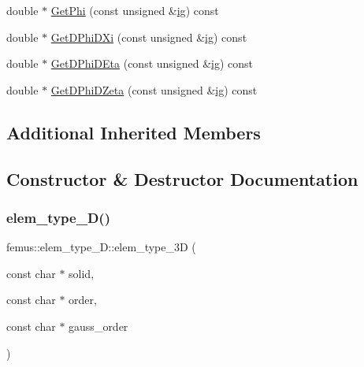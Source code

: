 \begin{DoxyCompactItemize}
double $\ast$ \mbox{\hyperlink{classfemus_1_1elem__type__3_d_ac25f62fb2b22b534172ce6ef94b89068}{Get\+Phi}} (const unsigned \&\mbox{\hyperlink{namespacefemus_a6df31099f676311de214a312d7043941}{ig}}) const
\item 
double $\ast$ \mbox{\hyperlink{classfemus_1_1elem__type__3_d_aff869fa323fd20f83fed73f4a28de006}{Get\+D\+Phi\+D\+Xi}} (const unsigned \&\mbox{\hyperlink{namespacefemus_a6df31099f676311de214a312d7043941}{ig}}) const
\item 
double $\ast$ \mbox{\hyperlink{classfemus_1_1elem__type__3_d_aa08787fdf3934c52c41a14a59884eb7b}{Get\+D\+Phi\+D\+Eta}} (const unsigned \&\mbox{\hyperlink{namespacefemus_a6df31099f676311de214a312d7043941}{ig}}) const
\item 
double $\ast$ \mbox{\hyperlink{classfemus_1_1elem__type__3_d_a8bf7020e0c07cf44c9532f9b6bab4bbc}{Get\+D\+Phi\+D\+Zeta}} (const unsigned \&\mbox{\hyperlink{namespacefemus_a6df31099f676311de214a312d7043941}{ig}}) const
\end{DoxyCompactItemize}
\subsection*{Additional Inherited Members}


\subsection{Constructor \& Destructor Documentation}
\mbox{\label{classfemus_1_1elem__type__3_d_a218cb9c26e839084933a2e6af9f30443}} 
\subsubsection{\texorpdfstring{elem\+\_\+type\+\_\+D()}{elem\_type\_3D()}}
{\footnotesize\ttfamily femus\+::elem\+\_\+type\+\_\+D\+::elem\+\_\+type\+\_\+3D (\begin{DoxyParamCaption}\item[{const char $\ast$}]{solid,  }\item[{const char $\ast$}]{order,  }\item[{const char $\ast$}]{gauss\+\_\+order }\end{DoxyParamCaption})}


